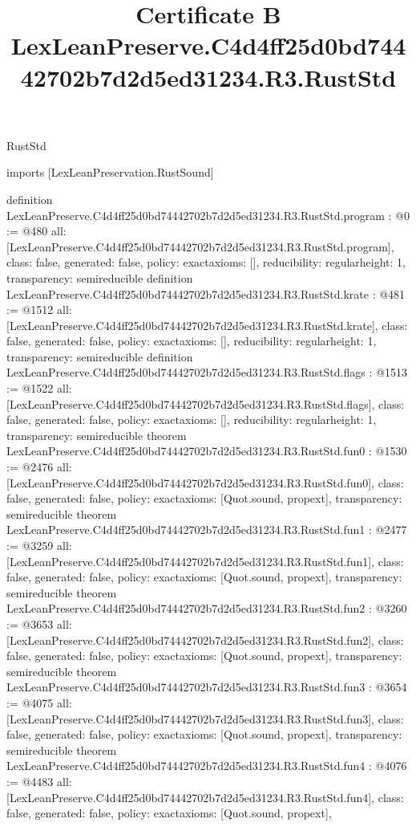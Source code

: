 \begin{lexlean}{RustStd}
\title{Certificate B LexLeanPreserve.C4d4ff25d0bd74442702b7d2d5ed31234.R3.RustStd}
\begin{coremodule}
imports [LexLeanPreservation.RustSound]

definition LexLeanPreserve.C4d4ff25d0bd74442702b7d2d5ed31234.R3.RustStd.program : @0 := @480 {
  all: [LexLeanPreserve.C4d4ff25d0bd74442702b7d2d5ed31234.R3.RustStd.program],
  class: false,
  generated: false,
  policy: exact{axioms: []},
  reducibility: regular{height: 1},
  transparency: semireducible
}
definition LexLeanPreserve.C4d4ff25d0bd74442702b7d2d5ed31234.R3.RustStd.krate : @481 := @1512 {
  all: [LexLeanPreserve.C4d4ff25d0bd74442702b7d2d5ed31234.R3.RustStd.krate],
  class: false,
  generated: false,
  policy: exact{axioms: []},
  reducibility: regular{height: 1},
  transparency: semireducible
}
definition LexLeanPreserve.C4d4ff25d0bd74442702b7d2d5ed31234.R3.RustStd.flags : @1513 := @1522 {
  all: [LexLeanPreserve.C4d4ff25d0bd74442702b7d2d5ed31234.R3.RustStd.flags],
  class: false,
  generated: false,
  policy: exact{axioms: []},
  reducibility: regular{height: 1},
  transparency: semireducible
}
theorem LexLeanPreserve.C4d4ff25d0bd74442702b7d2d5ed31234.R3.RustStd.fun0 : @1530 := @2476 {
  all: [LexLeanPreserve.C4d4ff25d0bd74442702b7d2d5ed31234.R3.RustStd.fun0],
  class: false,
  generated: false,
  policy: exact{axioms: [Quot.sound, propext]},
  transparency: semireducible
}
theorem LexLeanPreserve.C4d4ff25d0bd74442702b7d2d5ed31234.R3.RustStd.fun1 : @2477 := @3259 {
  all: [LexLeanPreserve.C4d4ff25d0bd74442702b7d2d5ed31234.R3.RustStd.fun1],
  class: false,
  generated: false,
  policy: exact{axioms: [Quot.sound, propext]},
  transparency: semireducible
}
theorem LexLeanPreserve.C4d4ff25d0bd74442702b7d2d5ed31234.R3.RustStd.fun2 : @3260 := @3653 {
  all: [LexLeanPreserve.C4d4ff25d0bd74442702b7d2d5ed31234.R3.RustStd.fun2],
  class: false,
  generated: false,
  policy: exact{axioms: [Quot.sound, propext]},
  transparency: semireducible
}
theorem LexLeanPreserve.C4d4ff25d0bd74442702b7d2d5ed31234.R3.RustStd.fun3 : @3654 := @4075 {
  all: [LexLeanPreserve.C4d4ff25d0bd74442702b7d2d5ed31234.R3.RustStd.fun3],
  class: false,
  generated: false,
  policy: exact{axioms: [Quot.sound, propext]},
  transparency: semireducible
}
theorem LexLeanPreserve.C4d4ff25d0bd74442702b7d2d5ed31234.R3.RustStd.fun4 : @4076 := @4483 {
  all: [LexLeanPreserve.C4d4ff25d0bd74442702b7d2d5ed31234.R3.RustStd.fun4],
  class: false,
  generated: false,
  policy: exact{axioms: [Quot.sound, propext]},
}
\end{coremodule}
\end{lexlean}
